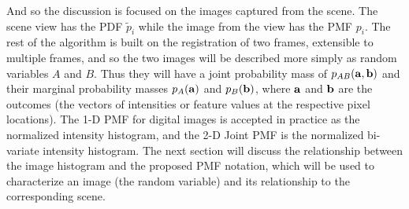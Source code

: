 And so the discussion is focused on the images captured from the scene. The scene view has the PDF $\tilde{p}_{i}$ while the image from the view has the PMF $p_{i}$. The rest of the algorithm is built on the registration of two frames, extensible to multiple frames, and so the two images will be described more simply as random variables $A$ and $B$. Thus they will have a joint probability mass of $p_{AB}(\bf{a},\bf{b})$ and their marginal probability masses $p_{A}(\bf{a})$ and $p_{B}(\bf{b})$, where $\bf{a}$ and $\bf{b}$ are the outcomes (the vectors of intensities or feature values at the respective pixel locations). The 1-D PMF for digital images is accepted in practice as the normalized intensity histogram, and the 2-D Joint PMF is the normalized bi-variate intensity histogram. The next section will discuss the relationship between the image histogram and the proposed PMF notation, which will be used to characterize an image (the random variable) and its relationship to the corresponding scene.




